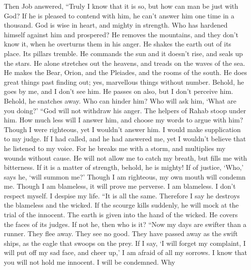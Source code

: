  Then Job answered,  ``Truly I know that it
is so, but how can man be just with God?  If he is pleased
to contend with him, he can't answer him one time in a thousand.
 God is wise in heart, and mighty in strength. Who has
hardened himself against him and prospered?  He removes
the mountains, and they don't know it, when he overturns them in his
anger.  He shakes the earth out of its place. Its pillars
tremble.  He commands the sun and it doesn't rise, and
seals up the stars.  He alone stretches out the heavens,
and treads on the waves of the sea.  He makes the Bear,
Orion, and the Pleiades, and the rooms of the south.  He
does great things past finding out; yes, marvellous things without
number.  Behold, he goes by me, and I don't see him. He
passes on also, but I don't perceive him.  Behold, he
snatches away. Who can hinder him? Who will ask him, `What are you
doing?'  ``God will not withdraw his anger. The helpers
of Rahab stoop under him.  How much less will I answer
him, and choose my words to argue with him?  Though I
were righteous, yet I wouldn't answer him. I would make supplication to
my judge.  If I had called, and he had answered me, yet I
wouldn't believe that he listened to my voice.  For he
breaks me with a storm, and multiplies my wounds without cause.
 He will not allow me to catch my breath, but fills me
with bitterness.  If it is a matter of strength, behold,
he is mighty! If of justice, `Who,' says he, `will summon me?'
 Though I am righteous, my own mouth will condemn me.
Though I am blameless, it will prove me perverse.  I am
blameless. I don't respect myself. I despise my life. 
``It is all the same. Therefore I say he destroys the blameless and the
wicked.  If the scourge kills suddenly, he will mock at
the trial of the innocent.  The earth is given into the
hand of the wicked. He covers the faces of its judges. If not he, then
who is it?  ``Now my days are swifter than a runner. They
flee away. They see no good.  They have passed away as
the swift ships, as the eagle that swoops on the prey. 
If I say, `I will forget my complaint, I will put off my sad face, and
cheer up,'  I am afraid of all my sorrows. I know that
you will not hold me innocent.  I will be condemned. Why

